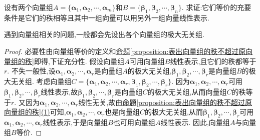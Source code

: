 \documentclass[../../main.tex]{subfiles}%
\begin{document}
\begin{proposition}[向量组等价的充要条件]\label{proposition:向量组等价的充要条件}
设有两个向量组\(A = \{\boldsymbol{\alpha}_1,\boldsymbol{\alpha}_2,\cdots,\boldsymbol{\alpha}_m\}\)和\(B = \{\boldsymbol{\beta}_1,\boldsymbol{\beta}_2,\cdots,\boldsymbol{\beta}_n\}\). 求证:它们等价的充要条件是它们的秩相等且其中一组向量可以用另外一组向量线性表示.
\end{proposition}
\begin{note}
遇到向量组相关的问题,一般都会先设出各个向量组的极大无关组.
\end{note}
\begin{proof}

必要性由向量组等价的定义和\hyperref[proposition:表出向量组的秩不超过原向量组的秩]{命题\ref{proposition:表出向量组的秩不超过原向量组的秩}}即得,下证充分性. 假设向量组\(A\)可用向量组\(B\)线性表示,且它们的秩都等于\(r\). 不失一般性,设\(\boldsymbol{\alpha}_1,\boldsymbol{\alpha}_2,\cdots,\boldsymbol{\alpha}_r\)是向量组\(A\)的极大无关组,\(\boldsymbol{\beta}_1,\boldsymbol{\beta}_2,\cdots,\boldsymbol{\beta}_r\)是向量组\(B\)的极大无关组. 考虑向量组\(C = \{\boldsymbol{\alpha}_1,\boldsymbol{\alpha}_2,\cdots,\boldsymbol{\alpha}_r,\boldsymbol{\beta}_1,\boldsymbol{\beta}_2,\cdots,\boldsymbol{\beta}_r\}\). 因为\(\boldsymbol{\alpha}_1,\boldsymbol{\alpha}_2,\cdots,\boldsymbol{\alpha}_r\)可用\(\boldsymbol{\beta}_1,\boldsymbol{\beta}_2,\cdots,\boldsymbol{\beta}_r\)线性表示,故\(\boldsymbol{\beta}_1,\boldsymbol{\beta}_2,\cdots,\boldsymbol{\beta}_r\)是向量组\(C\)的极大无关组,从而向量组\(C\)的秩等于\(r\). 又因为\(\boldsymbol{\alpha}_1,\boldsymbol{\alpha}_2,\cdots,\boldsymbol{\alpha}_r\)线性无关,故由\hyperref[proposition:表出向量组的秩不超过原向量组的秩]{命题\ref{proposition:表出向量组的秩不超过原向量组的秩}(1)}可知,\(\boldsymbol{\alpha}_1,\boldsymbol{\alpha}_2,\cdots,\boldsymbol{\alpha}_r\)也是向量组\(C\)的极大无关组,从而\(\boldsymbol{\beta}_1,\boldsymbol{\beta}_2,\cdots,\boldsymbol{\beta}_r\)可用\(\boldsymbol{\alpha}_1,\boldsymbol{\alpha}_2,\cdots,\boldsymbol{\alpha}_r\)线性表示,于是向量组\(B\)也可用向量组\(A\)线性表示. 因此,向量组\(A\)与向量组\(B\)等价. 

\end{proof}
\end{document}
